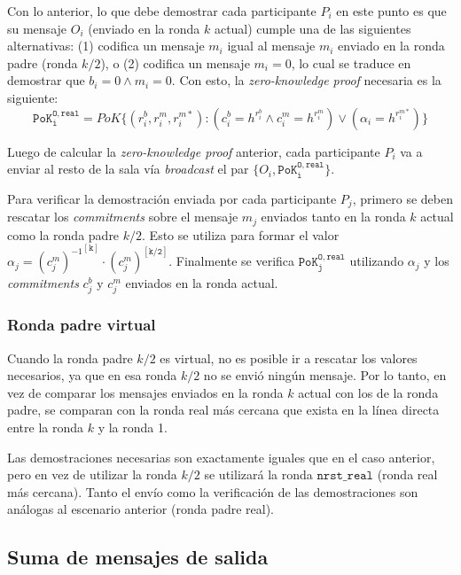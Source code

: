 Con lo anterior, lo que debe demostrar cada participante $P_i$ en este punto es que su 
mensaje $O_i$ (enviado en la ronda $k$ actual) cumple una de las siguientes 
alternativas: (1) codifica un mensaje $m_i$ igual al mensaje $m_i$ enviado en la ronda 
padre (ronda $k/2$), o (2) codifica un mensaje $m_i = 0$, lo cual se traduce en 
demostrar que $b_i = 0 \land m_i = 0$. Con esto, la \emph{zero-knowledge proof} 
necesaria es la siguiente: 
$$\mathtt{PoK_i^{O, real}} = PoK\{(r_i^b, r_i^m, r_i^{m*}) : (c_i^b = h^{r_i^b} \land c_i^m = h^{r_i^m}) \lor (\alpha_i = h^{r_i^{m*}}) \}$$

Luego de calcular la \emph{zero-knowledge proof} anterior, cada participante $P_i$ va a 
enviar al resto de la sala vía \emph{broadcast} el par $\{O_i, \mathtt{PoK_i^{O, real}}\}$.

Para verificar la demostración enviada por cada participante $P_j$, primero se deben 
rescatar los \emph{commitments} sobre el mensaje $m_j$ enviados tanto en la ronda $k$ 
actual como la ronda padre $k/2$. Esto se utiliza para formar el valor 
$\alpha_j = {(c_j^m)^{-1}}^\mathtt{[k]} \cdot {(c_j^m)}^\mathtt{[k/2]}$. 
Finalmente se verifica $\mathtt{PoK_j^{O, real}}$ utilizando $\alpha_j$ y los 
\emph{commitments} $c_j^b$ y $c_j^m$ enviados en la ronda actual.

\subsubsection{Ronda padre virtual}

Cuando la ronda padre $k/2$ es virtual, no es posible ir a rescatar los valores 
necesarios, ya que en esa ronda $k/2$ no se envió ningún mensaje. Por lo tanto, 
en vez de comparar los mensajes enviados en la ronda $k$ actual con los de la 
ronda padre, se comparan con la ronda real más cercana que exista en la línea 
directa entre la ronda $k$ y la ronda 1. 


Las demostraciones necesarias son exactamente iguales que en el caso anterior, 
pero en vez de utilizar la ronda $k/2$ se utilizará la ronda $\mathtt{nrst\_real}$ 
(ronda real más cercana). Tanto el envío como la verificación de las demostraciones 
son análogas al escenario anterior (ronda padre real).

\subsection{Suma de mensajes de salida}

